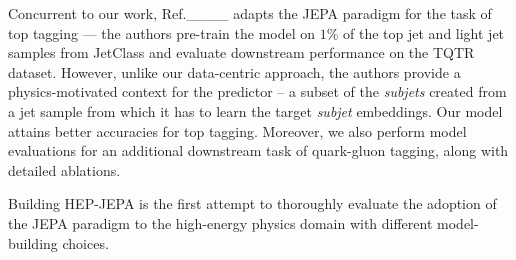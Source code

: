 Concurrent to our work, Ref.____ adapts the JEPA paradigm for the task of top tagging --- the authors pre-train the model on $1\%$ of the top jet and light jet samples from JetClass and evaluate downstream performance on the TQTR dataset. However, unlike our data-centric approach, the authors provide a physics-motivated context for the predictor -- a subset of the \emph{subjets} created from a jet sample from which it has to learn the target \emph{subjet} embeddings. Our model attains better accuracies for top tagging. Moreover, we also perform model evaluations for an additional downstream task of quark-gluon tagging, along with detailed ablations.

Building HEP-JEPA is the first attempt to thoroughly evaluate the adoption of the JEPA paradigm to the high-energy physics domain with different model-building choices.